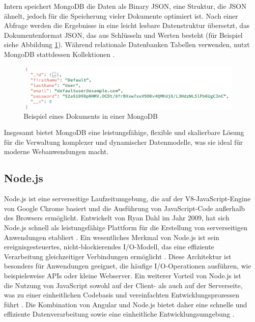 Intern speichert MongoDB die Daten als Binary \ac{JSON}, eine Struktur, die JSON ähnelt, jedoch für die Speicherung vieler Dokumente optimiert ist. 
Nach einer Abfrage werden die Ergebnisse in eine leicht lesbare Datenstruktur übersetzt, das Dokumentenformat JSON, das aus Schlüsseln und Werten besteht (für Beispiel siehe Abbildung \ref{MongoDB_Document}). 
Während relationale Datenbanken Tabellen verwenden, nutzt MongoDB stattdessen Kollektionen \cite[S.7]{Banker2016MongoDB}.

\begin{figure}[h]
    \centering
    \includegraphics[clip,width=0.65\linewidth]{images/MongoDB_Document.png}
    \caption[Beispiel eines Dokuments in einer MongoDB]{Beispiel eines Dokuments in einer MongoDB}
    \label{MongoDB_Document}
\end{figure}

Insgesamt bietet MongoDB eine leistungsfähige, flexible und skalierbare Lösung für die Verwaltung komplexer und dynamischer Datenmodelle, was sie ideal für moderne Webanwendungen macht.

\subsection{Node.js}
Node.js ist eine serverseitige Laufzeitumgebung, die auf der V8-JavaScript-Engine von Google Chrome basiert und die Ausführung von JavaScript-Code außerhalb des Browsers ermöglicht. 
Entwickelt von Ryan Dahl im Jahr 2009, hat sich Node.js schnell als leistungsfähige Plattform für die Erstellung von serverseitigen Anwendungen etabliert \cite[S.3 ff.]{Cantelon2014}. 
Ein wesentliches Merkmal von Node.js ist sein ereignisgesteuertes, nicht-blockierendes I/O-Modell, das eine effiziente Verarbeitung gleichzeitiger Verbindungen ermöglicht \cite{Tilkov2010}. 
Diese Architektur ist besonders für Anwendungen geeignet, die häufige I/O-Operationen ausführen, wie beispielsweise APIs oder kleine Webserver. 
Ein weiterer Vorteil von Node.js ist die Nutzung von JavaScript sowohl auf der Client- als auch auf der Serverseite, was zu einer einheitlichen Codebasis und vereinfachten Entwicklungsprozessen führt . 
Die Kombination von Angular und Node.js bietet daher eine schnelle und effiziente Datenverarbeitung sowie eine einheitliche Entwicklungsumgebung \cite[S.5 ff.]{Casciaro2020node}.